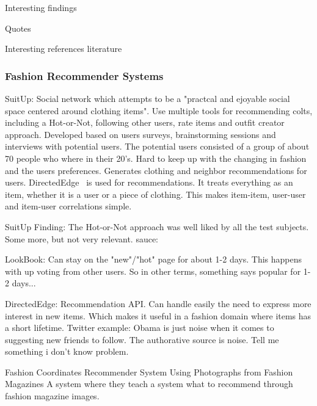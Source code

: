 Interesting findings

Quotes

Interesting references literature




\subsubsection{Fashion Recommender Systems}

SuitUp:
Social network which attempts to be a "practcal and ejoyable social space
centered around clothing items".  Use multiple tools for recommending colts,
including a Hot-or-Not, following other users, rate items and outfit creator
approach.  Developed based on users surveys, brainstorming sessions and
interviews with potential users.  The potential users consisted of a group of
about 70 people who where in their 20's.  Hard to keep up with the changing in
fashion and the users preferences.  Generates clothing and neighbor
recommendations for users.  DirectedEdge~\cite{direcetedEdge} is used for
recommendations.  It treats everything as an item, whether it is a user or a
piece of clothing.  This makes item-item, user-user and item-user correlations
simple.

SuitUp Finding:
The Hot-or-Not approach was well liked by all the test subjects.  Some more,
but not very relevant.
sauce:\cite{SuitUp}

LookBook:
Can stay on the "new"/"hot" page for about 1-2 days.
This happens with up voting from other users.
So in other terms, something says popular for 1-2 days...

DirectedEdge:
Recommendation API.
Can handle easily the need to express more interest in new items.  Which makes
it useful in a fashion domain where items has a short lifetime.
Twitter example: Obama is just noise when it comes to suggesting new friends to
follow.  The authorative source is noise.  Tell me something i don't know
problem.

Fashion Coordinates Recommender System Using Photographs from Fashion Magazines
\cite{Iwata:2011} A system where they teach a system what to recommend through
fashion magazine images.




